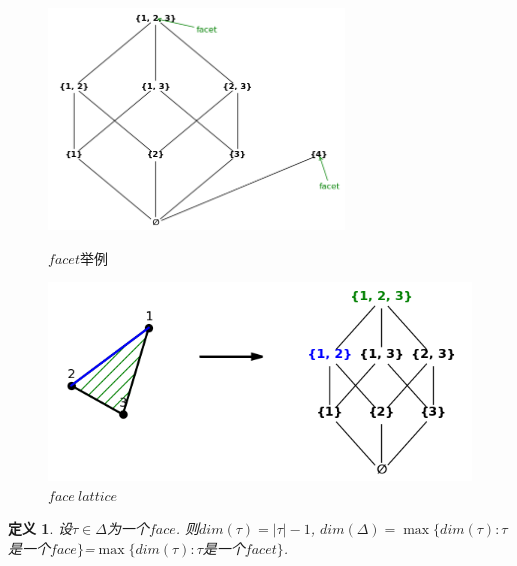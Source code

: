 \documentclass[12pt,a4paper]{ctexbook} %
\newcounter{theorem}[section]
\newtheorem{definition}[theorem]{定义}
\numberwithin{figure}{section}
\theoremstyle{problemstyle}
\numberwithin{equation}{section} %
\begin{document}
\begin{figure}[H]
	\centering 
	\begin{minipage}[b]{0.45\textwidth}
	\centering
        \includegraphics[width=0.7\textwidth]{facet举例}%
		\caption{$facet$举例}
	\end{minipage}
	\begin{minipage}[b]{0.45\textwidth}
	\centering
		\includegraphics[width=1.2\textwidth]{face lattice}
		\caption{$face\ lattice$}%
	\end{minipage}
\end{figure}
	
	\begin{definition}
		设$\tau \in\Delta$为一个$face$. 则$dim(\tau)=|\tau|-1$, $dim(\Delta)=\max\{dim(\tau):\tau $是一个$face\}$=$\max\{dim(\tau):\tau $是一个$facet\}$. 
	\end{definition}
	
\end{document}
